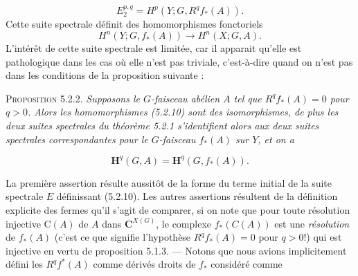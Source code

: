 \[
E_2^{p,q}=H^p(Y;G,R^qf_*(A)).
\]
Cette suite spectrale définit des homomorphismes fonctoriels
\[
H^n(Y;G,f_*(A))\to H^n(X;G,A).
\tag{5.2.10}
\]
L'intérêt de cette suite spectrale est limitée, car il apparait qu'elle est
pathologique dans les cas où elle n'est pas triviale, c'est-à-dire quand on
n'est pas dans les conditions de la proposition suivante :

\textsc{Proposition 5.2.2.} \textit{Supposons le $G$-faisceau
abélien $A$ tel que $R^qf_*(A)=0$ pour $q>0$. Alors les homomorphismes
\textup{(5.2.10)} sont des isomorphismes, de plus les deux suites spectrales du
théorème \textup{5.2.1} s'identifient alors aux deux suites spectrales correspondantes
pour le $G$-faisceau $f_*(A)$ sur $Y$, et on a}

\[
\mathbf H^q(G,A)=\mathbf H^q(G,f_*(A)).
\tag{5.2.11}
\]

La première assertion résulte aussitôt de la forme du terme initial de la
suite spectrale $E$ définissant (5.2.10). Les autres assertions résultent de
la définition explicite des fermes qu'il s'agit de comparer, si on note que
pour toute résolution injective $\mathrm C(A)$ de $A$ dans ${\mathbf C}^{X(G)}$, le complexe
$f_*(C(A))$ est une \textit{résolution} de $f_*(A)$ (c'est ce que signifie
l'hypothèse $R^qf_*(A)=0$ pour $q>0$!) qui est injective en vertu de
proposition 5.1.3. --- Notons que nous avions implicitement défini les
$R^qf^*(A)$ comme dérivés droits de $f_*$ considéré comme

